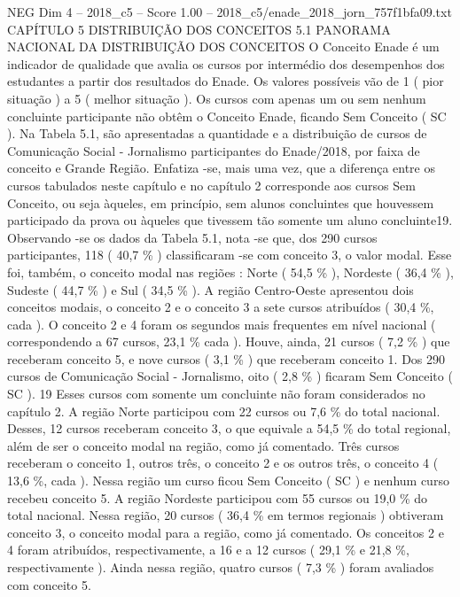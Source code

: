 \begin{textsample}{NEG Dim 4 – 2018\_c5 – Score 1.00 – 2018\_c5/enade\_2018\_jorn\_757f1bfa09.txt}  \label{ex:f4_neg_136}
CAPÍTULO 5 DISTRIBUIÇÃO DOS CONCEITOS 5.1 PANORAMA NACIONAL DA DISTRIBUIÇÃO DOS CONCEITOS O Conceito Enade é um indicador de qualidade que avalia os cursos por intermédio dos desempenhos dos estudantes a partir dos resultados do Enade.
Os valores possíveis vão de 1 ( pior situação ) a 5 ( melhor situação ).
Os cursos com apenas um ou sem nenhum concluinte participante não obtêm o Conceito Enade, ficando Sem Conceito ( SC ).
Na Tabela 5.1, são apresentadas a quantidade e a distribuição de cursos de Comunicação Social - Jornalismo participantes do Enade/2018, por faixa de conceito e Grande Região.
Enfatiza -se, mais uma vez, que a diferença entre os cursos tabulados neste capítulo e no capítulo 2 corresponde aos cursos Sem Conceito, ou seja àqueles, em princípio, sem alunos concluintes que houvessem participado da prova ou àqueles que tivessem tão somente um aluno concluinte19.
Observando -se os dados da Tabela 5.1, nota -se que, dos 290 cursos participantes, 118 ( 40,7 \% ) classificaram -se com conceito 3, o valor modal.
Esse foi, também, o conceito modal nas regiões : Norte ( 54,5 \% ), Nordeste ( 36,4 \% ), Sudeste ( 44,7 \% ) e Sul ( 34,5 \% ).
A região Centro-Oeste apresentou dois conceitos modais, o conceito 2 e o conceito 3 a sete cursos atribuídos ( 30,4 \%, cada ).
O conceito 2 e 4 foram os segundos mais frequentes em nível nacional ( correspondendo a 67 cursos, 23,1 \% cada ).
Houve, ainda, 21 cursos ( 7,2 \% ) que receberam conceito 5, e nove cursos ( 3,1 \% ) que receberam conceito 1.
Dos 290 cursos de Comunicação Social - Jornalismo, oito ( 2,8 \% ) ficaram Sem Conceito ( SC ). 19 Esses cursos com somente um concluinte não foram considerados no capítulo 2.
A região Norte participou com 22 cursos ou 7,6 \% do total nacional.
Desses, 12 cursos receberam conceito 3, o que equivale a 54,5 \% do total regional, além de ser o conceito modal na região, como já comentado.
Três cursos receberam o conceito 1, outros três, o conceito 2 e os outros três, o conceito 4 ( 13,6 \%, cada ).
Nessa região um curso ficou Sem Conceito ( SC ) e nenhum curso recebeu conceito 5.
A região Nordeste participou com 55 cursos ou 19,0 \% do total nacional.
Nessa região, 20 cursos ( 36,4 \% em termos regionais ) obtiveram conceito 3, o conceito modal para a região, como já comentado.
Os conceitos 2 e 4 foram atribuídos, respectivamente, a 16 e a 12 cursos ( 29,1 \% e 21,8 \%, respectivamente ).
Ainda nessa região, quatro cursos ( 7,3 \% ) foram avaliados com conceito 5.

\end{textsample}
